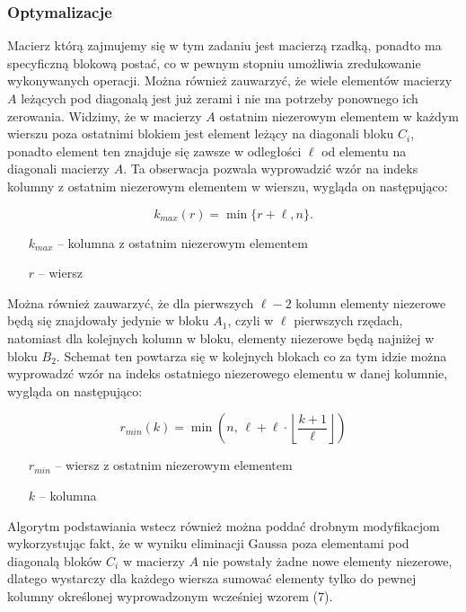 \documentclass[12pt, a4paper]{article}
\begin{document}
\subsubsection{Optymalizacje}

Macierz którą zajmujemy się w tym zadaniu jest macierzą rzadką, ponadto ma specyficzną blokową postać, co w pewnym stopniu umożliwia zredukowanie wykonywanych operacji. Można również zauwarzyć, że wiele elementów macierzy $A$ leżących pod diagonalą jest już zerami i nie ma potrzeby ponownego ich zerowania. Widzimy, że w macierzy $A$ ostatnim niezerowym elementem w każdym wierszu poza ostatnimi blokiem jest element leżący na diagonali bloku $C_i$, ponadto element ten znajduje się zawsze w odległości $\ell$ od elementu na diagonali macierzy $A$. Ta obserwacja pozwala wyprowadzić wzór na indeks kolumny z ostatnim niezerowym elementem w wierszu, wygląda on następująco: 

\begin{equation}
k_{max}(r) = \min\{r + \ell, n\}.
\end{equation}
\begin{itemize}
\item[$k_{max}$]-- kolumna z ostatnim niezerowym elementem
\item[$r$] -- wiersz
\end{itemize}

\noindent Można również zauwarzyć, że dla pierwszych $\ell-2$ kolumn elementy niezerowe będą się znajdowały jedynie w bloku $A_1$, czyli w $\ell$ pierwszych rzędach, natomiast dla  kolejnych kolumn w bloku, elementy niezerowe będą najniżej w bloku $B_2$. Schemat ten powtarza się w kolejnych blokach co za tym idzie można wyprowadzć wzór na indeks ostatniego niezerowego elementu w danej kolumnie, wygląda on następująco:

\begin{equation}
r_{min}(k) = \min\left(n, \, \ell + \ell \cdot \left \lfloor\frac{k + 1}{\ell}\right \rfloor\right)
\end{equation}
\begin{itemize}
\item[$r_{min}$] -- wiersz z ostatnim niezerowym elementem
\item[$k$] -- kolumna
\end{itemize}

\noindent Algorytm podstawiania wstecz również można poddać drobnym modyfikacjom wykorzystując fakt, że w wyniku eliminacji Gaussa poza elementami pod diagonalą bloków $C_i$ w macierzy $A$ nie powstały żadne nowe elementy niezerowe, dlatego wystarczy dla każdego wiersza sumować elementy tylko do pewnej kolumny określonej wyprowadzonym wcześniej wzorem (7). \\
\end{document}
